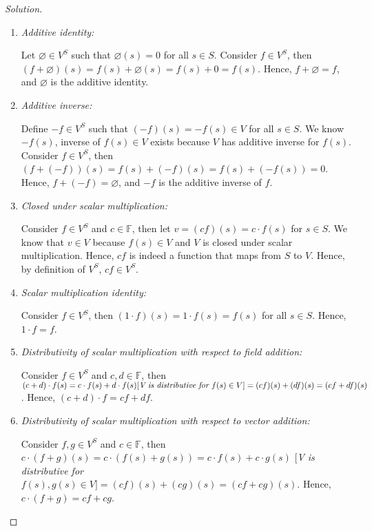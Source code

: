\documentclass{article}
\begin{document}
\begin{proof}[Solution]
\begin{enumerate}
        \item \emph{Additive identity:}
        
        Let $\varnothing \in V^S$ such that $\varnothing(s) = 0$ for all 
        $s \in S$. Consider $f \in V^S$, then $(f + \varnothing)(s) = f(s) + \varnothing(s) = f(s) 
        + 0 = f(s)$. Hence, $f + \varnothing = f$, and $\varnothing$ is the additive identity.

        \item \emph{Additive inverse:}
        
        Define $-f \in V^S$ such that $(-f)(s) = -f(s) \in V$ for all $s \in S$. We know $-f(s)$, 
        inverse of $f(s) \in V$ exists because $V$ has additive inverse for $f(s)$. Consider $f \in 
        V^S$, then $(f + (-f))(s) = f(s) + (-f)(s) = f(s) + (-f(s)) = 0$. Hence, $f + (-f) = 
        \varnothing$, and $-f$ is the additive inverse of $f$.

        \item \emph{Closed under scalar multiplication:}
        
        Consider $f \in V^S$ and $c \in \mathbb{F}$, then let $v = (cf)(s) = c \cdot f(s)$ for 
        $s \in S$. We know that $v \in V$ because $f(s) \in V$ and $V$ is closed under scalar 
        multiplication. Hence, $cf$ is indeed a function that maps from $S$ to $V$. Hence, by 
        definition of $V^S$, $cf \in V^S$. 

        \item \emph{Scalar multiplication identity:}
        
        Consider $f \in V^S$, then $(1\cdot f)(s) = 1\cdot f(s) = f(s)$ for all $s \in S$. 
        Hence, $1\cdot f = f$.

        \item \emph{Distributivity of scalar multiplication with respect to field addition:}
        
        Consider $f \in V^S$ and $c, d \in \mathbb{F}$, then $(c + d)\cdot f(s) = c\cdot f(s)
        + d\cdot f(s) [\emph{V is distributive for } f(s)\in V] = (cf)(s) + (df)(s) = (cf + df)(s)$. 
        Hence, $(c + d)\cdot f = cf + df$.
        
        \item \emph{Distributivity of scalar multiplication with respect to vector addition:}
        
        Consider $f, g \in V^S$ and $c \in \mathbb{F}$, then $c\cdot(f + g)(s) = c\cdot (f(s)
        + g(s)) = c\cdot f(s) + c\cdot g(s)$ [\emph{V is distributive for }$f(s), g(s)\in V] = 
        (cf)(s) + (cg)(s) = (cf + cg)(s)$. Hence, $c\cdot(f + g) = cf + cg$.
    \end{enumerate}
\end{proof}
\end{document}
